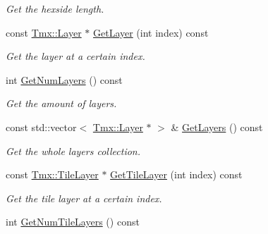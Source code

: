 \begin{DoxyCompactItemize}
\begin{DoxyCompactList}\small\item\em Get the hexside length. \end{DoxyCompactList}\item 
\hypertarget{classTmx_1_1Map_aea9eb94cf709bd31f0cb4cc033f1c96c}{const \hyperlink{classTmx_1_1Layer}{Tmx\-::\-Layer} $\ast$ \hyperlink{classTmx_1_1Map_aea9eb94cf709bd31f0cb4cc033f1c96c}{Get\-Layer} (int index) const }\label{classTmx_1_1Map_aea9eb94cf709bd31f0cb4cc033f1c96c}

\begin{DoxyCompactList}\small\item\em Get the layer at a certain index. \end{DoxyCompactList}\item 
\hypertarget{classTmx_1_1Map_ad2a948b09fd47d4370830498ace72cb6}{int \hyperlink{classTmx_1_1Map_ad2a948b09fd47d4370830498ace72cb6}{Get\-Num\-Layers} () const }\label{classTmx_1_1Map_ad2a948b09fd47d4370830498ace72cb6}

\begin{DoxyCompactList}\small\item\em Get the amount of layers. \end{DoxyCompactList}\item 
\hypertarget{classTmx_1_1Map_a60def10fd94a3027d70e80876c836286}{const std\-::vector$<$ \hyperlink{classTmx_1_1Layer}{Tmx\-::\-Layer} $\ast$ $>$ \& \hyperlink{classTmx_1_1Map_a60def10fd94a3027d70e80876c836286}{Get\-Layers} () const }\label{classTmx_1_1Map_a60def10fd94a3027d70e80876c836286}

\begin{DoxyCompactList}\small\item\em Get the whole layers collection. \end{DoxyCompactList}\item 
\hypertarget{classTmx_1_1Map_a20af7306c305815dad3023c8bd06bb15}{const \hyperlink{classTmx_1_1TileLayer}{Tmx\-::\-Tile\-Layer} $\ast$ \hyperlink{classTmx_1_1Map_a20af7306c305815dad3023c8bd06bb15}{Get\-Tile\-Layer} (int index) const }\label{classTmx_1_1Map_a20af7306c305815dad3023c8bd06bb15}

\begin{DoxyCompactList}\small\item\em Get the tile layer at a certain index. \end{DoxyCompactList}\item 
\hypertarget{classTmx_1_1Map_abe0294845cf427b2446b36fec48ebd77}{int \hyperlink{classTmx_1_1Map_abe0294845cf427b2446b36fec48ebd77}{Get\-Num\-Tile\-Layers} () const }\label{classTmx_1_1Map_abe0294845cf427b2446b36fec48ebd77}


\end{DoxyCompactItemize}

